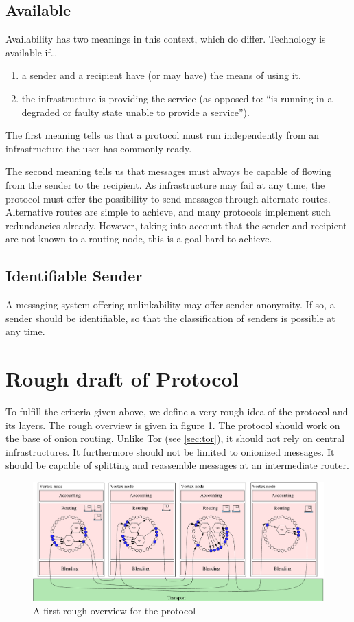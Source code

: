 \subsection{Available}
Availability has two meanings in this context, which do differ. Technology is available if\ldots
\begin{enumerate}
	\item a sender and a recipient have (or may have) the means of using it.
	\item the infrastructure is providing the service (as opposed to: ``is running in a degraded or faulty state unable to provide a service'').
\end{enumerate}

The first meaning tells us that a protocol must run independently from an infrastructure the user has commonly ready.

The second meaning tells us that messages must always be capable of flowing from the sender to the recipient. As infrastructure may fail at any time, the protocol must offer the possibility to send messages through alternate routes. Alternative routes are simple to achieve, and many protocols implement such redundancies already. However, taking into account that the sender and recipient are not known to a routing node, this is a goal hard to achieve.

\subsection{Identifiable Sender}
A messaging system offering unlinkability may offer sender anonymity. If so, a sender should be identifiable, so that the classification of senders is possible at any time.

\section{Rough draft of Protocol}

To fulfill the criteria given above, we define a very rough idea of the protocol and its layers. The rough overview is given in figure \ref{fig:roughProtocolDesign}. The protocol should work on the base of onion routing. Unlike Tor (see \ref{sec:tor}), it should not rely on central infrastructures. It furthermore should not be limited to onionized messages. It should be capable of splitting and reassemble messages at an intermediate router.

\begin{figure}[ht]
	\includegraphics[width=\columnwidth]{inc/roughProtocolDesign.pdf}
	\caption{A first rough overview for the protocol}
	\label{fig:roughProtocolDesign}
\end{figure}    

